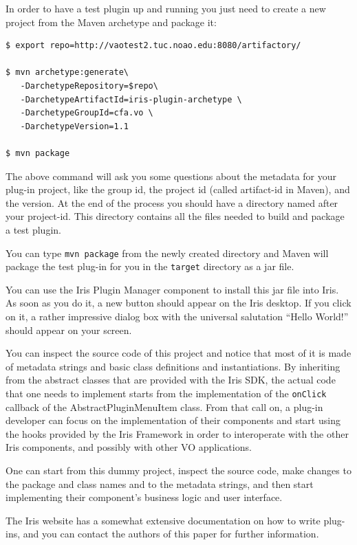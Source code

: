 \documentclass[5p]{elsarticle}
\begin{document}
In order to have a test plugin up and running you just need to create a new project from the Maven archetype and package it:

\begin{lstlisting}[style=code]
$ export repo=http://vaotest2.tuc.noao.edu:8080/artifactory/ 

$ mvn archetype:generate\
   -DarchetypeRepository=$repo\
   -DarchetypeArtifactId=iris-plugin-archetype \
   -DarchetypeGroupId=cfa.vo \
   -DarchetypeVersion=1.1

$ mvn package
\end{lstlisting}

The above command will ask you some questions about the metadata for your plug-in project, like the group id, the project id (called artifact-id in Maven), and the version. At the end of the process you should have a directory named after your project-id. This directory contains all the files needed to build and package a test plugin.

You can type \verb|mvn package| from the newly created directory and Maven will package the test plug-in for you in the \verb|target| directory as a jar file.

You can use the Iris Plugin Manager component to install this jar file into Iris. As soon as you do it, a new button should appear on the Iris desktop. If you click on it, a rather impressive dialog box with the universal salutation ``Hello World!'' should appear on your screen.

You can inspect the source code of this project and notice that most of it is made of metadata strings and basic class definitions and instantiations. By inheriting from the abstract classes that are provided with the Iris SDK, the actual code that one needs to implement starts from the implementation of the \verb|onClick| callback of the AbstractPluginMenuItem class. From that call on, a plug-in developer can focus on the implementation of their components and start using the hooks provided by the Iris Framework in order to interoperate with the other Iris components, and possibly with other VO applications.

One can start from this dummy project, inspect the source code, make changes to the package and class names and to the metadata strings, and then start implementing their component's business logic and user interface.

The Iris website has a somewhat extensive documentation on how to write plug-ins, and you can contact the authors of this paper for further information.
\end{document}

